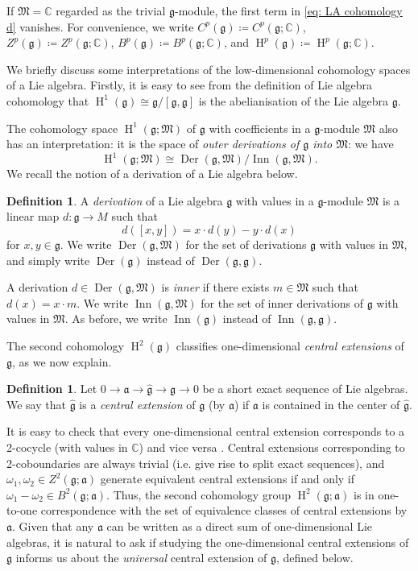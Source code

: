 \documentclass[11pt, svgnames]{amsart}
\newcommand{\g}{\ensuremath{\mathfrak{g}}}
\newcommand{\M}{\mathfrak{M}}
\newcommand{\CC}{\mathbb{C}}
\DeclareMathOperator{\Der}{Der}
\DeclareMathOperator{\Inn}{Inn}
\DeclareMathOperator{\HH}{H}
\theoremstyle{definition}
\newtheorem{defn}[proposition]{Definition}
\begin{document}
If $\M = \CC$ regarded as the trivial $\g$-module, the first term in \eqref{eq: LA cohomology d} vanishes. For convenience, we write $C^p(\g) \coloneqq C^p(\g;\CC)$, $Z^p(\g) \coloneqq Z^p(\g;\CC)$, $B^p(\g) \coloneqq B^p(\g;\CC)$, and $\HH^p(\g) \coloneqq \HH^p(\g;\CC)$.

We briefly discuss some interpretations of the low-dimensional cohomology spaces of a Lie algebra. Firstly, it is easy to see from the definition of Lie algebra cohomology that $\HH^1(\g) \cong \g/[\g,\g]$ is the abelianisation of the Lie algebra $\g$.

The cohomology space $\HH^1(\g;\M)$ of $\g$ with coefficients in a $\g$-module $\M$ also has an interpretation: it is the space of \emph{outer derivations of $\g$ into $\M$}: we have
$$\HH^1(\g;\M) \cong \Der(\g,\M)/\Inn(\g,\M).$$
We recall the notion of a derivation of a Lie algebra below.

\begin{defn}\label{def:derivation}
    A \emph{derivation} of a Lie algebra $\g$ with values in a $\g$-module $\M$ is a linear map $d \colon \g \to M$ such that
    $$d([x,y]) = x \cdot d(y) - y \cdot d(x)$$
    for $x,y \in \g$. We write $\Der(\g,\M)$ for the set of derivations $\g$ with values in $\M$, and simply write $\Der(\g)$ instead of $\Der(\g,\g)$.
    
    A derivation $d \in \Der(\g,\M)$ is \emph{inner} if there exists $m \in \M$ such that $d(x) = x \cdot m$. We write $\Inn(\g,\M)$ for the set of inner derivations of $\g$ with values in $\M$. As before, we write $\Inn(\g)$ instead of $\Inn(\g,\g)$.
\end{defn}

The second cohomology $\HH^2(\g)$ classifies one-dimensional \emph{central extensions} of $\g$, as we now explain.

\begin{defn}
    Let $0 \to \mathfrak{a} \to \widehat{\g} \to \g \to 0$ be a short exact sequence of Lie algebras. We say that $\widehat{\g}$ is a \emph{central extension} of $\g$ (by $\mathfrak{a}$) if $\mathfrak{a}$ is contained in the center of $\widehat{\g}$.
\end{defn}

It is easy to check that every one-dimensional central extension corresponds to a 2-cocycle (with values in $\CC$) and vice versa \cite[Chapter 4]{Schottenloher}. Central extensions corresponding to 2-coboundaries are always trivial (i.e. give rise to split exact sequences), and $\omega_1, \omega_2 \in Z^2(\g; \mathfrak{a})$ generate equivalent central extensions if and only if $\omega_1 - \omega_2 \in B^2(\g; \mathfrak{a})$. Thus, the second cohomology group $\HH^2(\g; \mathfrak{a})$ is in one-to-one correspondence with the set of equivalence classes of central extensions by $\mathfrak{a}$.
Given that any $\mathfrak{a}$ can be written as a direct sum of one-dimensional Lie algebras, it is natural to ask if studying the one-dimensional central extensions of $\g$ informs us about the \emph{universal} central extension of $\g$, defined below.
\end{document}
